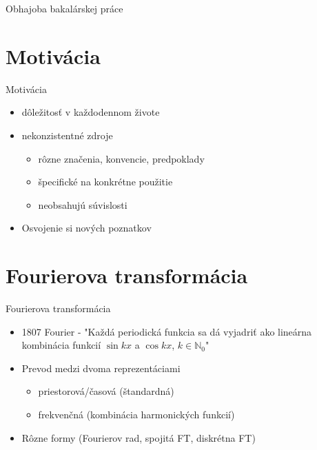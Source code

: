 \documentclass{beamer}
\date{\today}
\title\mytitle
\author\myauthor
\begin{document}
\begin{frame}{Obhajoba bakalárskej práce}
    \titlepage
\end{frame}


\section{Motivácia}
\begin{frame}{Motivácia}
    \begin{itemize}
        \item dôležitosť v každodennom živote
        \item nekonzistentné zdroje
            \begin{itemize}
                \item rôzne značenia, konvencie, predpoklady
                \item špecifické na konkrétne použitie
                \item neobsahujú súvislosti
            \end{itemize}
        \item Osvojenie si nových poznatkov
    \end{itemize}
\end{frame}

\section{Fourierova transformácia}
\begin{frame}{Fourierova transformácia}
    \begin{itemize}
        \item 1807 Fourier - "Každá periodická funkcia sa dá vyjadriť
        ako lineárna kombinácia funkcií $\sin kx$ a $\cos kx$,
        $k \in \mathbb{N}_0$"
        \item Prevod medzi dvoma reprezentáciami
            \begin{itemize}
                \item priestorová/časová (štandardná)
                \item frekvenčná (kombinácia harmonických funkcií)
            \end{itemize}
        \item Rôzne formy (Fourierov rad, spojitá FT, diskrétna FT)
    \end{itemize}
\end{frame}
\end{document}
